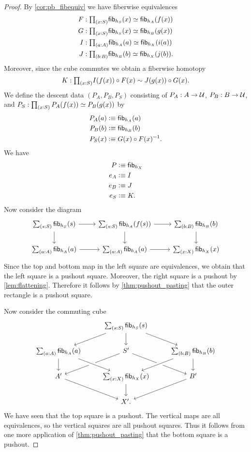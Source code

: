 \begin{proof}
By \cref{cor:pb_fibequiv} we have fiberwise equivalences
\begin{align*}
F & : \prd{x:S}\eqv{\fib{h_S}{x}}{\fib{h_A}{f(x)}} \\
G & : \prd{x:S}\eqv{\fib{h_S}{x}}{\fib{h_B}{g(x)}} \\
I & : \prd{a:A}\eqv{\fib{h_A}{a}}{\fib{h_X}{i(a)}} \\
J & : \prd{b:B}\eqv{\fib{h_B}{b}}{\fib{h_X}{j(b)}}. 
\end{align*}
Moreover, since the cube commutes we obtain a fiberwise homotopy
\begin{equation*}
K : \prd{x:S} I(f(x))\circ F(x) \htpy J(g(x))\circ G(x).
\end{equation*}
We define the descent data $(P_A,P_B,P_S)$ consisting of $P_A:A\to\mathcal{U}$, $P_B:B\to\mathcal{U}$, and $P_S:\prd{x:S}\eqv{P_A(f(x))}{P_B(g(x))}$ by
\begin{align*}
P_A(a) & \vcentcolon\equiv \mathsf{fib}_{h_A}(a) \\
P_B(b) & \vcentcolon\equiv \mathsf{fib}_{h_B}(b) \\
P_S(x) & \vcentcolon\equiv G(x)\circ F(x)^{-1}.
\end{align*}
We have
\begin{align*}
P & \vcentcolon\equiv \mathsf{fib}_{h_X} \\
e_A & \vcentcolon\equiv I \\
e_B & \vcentcolon\equiv J \\
e_S & \vcentcolon\equiv K.
\end{align*}
Now consider the diagram
\begin{equation*}
\begin{tikzcd}
\sm{s:S}\fib{h_S}{s} \arrow[r] \arrow[d] & \sm{s:S}\fib{h_A}{f(s)} \arrow[r] \arrow[d] & \sm{b:B}\fib{h_B}{b} \arrow[d] \\
\sm{a:A}\fib{h_A}{a} \arrow[r] & \sm{a:A}\fib{h_A}{a} \arrow[r] & \sm{x:X}\fib{h_X}{x}
\end{tikzcd}
\end{equation*}
Since the top and bottom map in the left square are equivalences, we obtain that the left square is a pushout square. Moreover, the right square is a pushout by \cref{lem:flattening}. Therefore it follows by \cref{thm:pushout_pasting} that the outer rectangle is a pushout square.

Now consider the commuting cube
\begin{equation*}
\begin{tikzcd}
& \sm{s:S}\fib{h_S}{s} \arrow[dl] \arrow[dr] \arrow[d] \\
\sm{a:A}\fib{h_A}{a} \arrow[d] & S' \arrow[dl] \arrow[dr] & \sm{b:B}\fib{h_B}{b} \arrow[dl,crossing over] \arrow[d] \\
A' \arrow[dr,swap] & \sm{x:X}\fib{h_X}{x} \arrow[d] \arrow[from=ul,crossing over] & B' \arrow[dl] \\
& X'.
\end{tikzcd}
\end{equation*}
We have seen that the top square is a pushout. The vertical maps are all equivalences, so the vertical squares are all pushout squares. Thus it follows from one more application of \cref{thm:pushout_pasting} that the bottom square is a pushout.
\end{proof}

